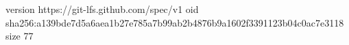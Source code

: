 version https://git-lfs.github.com/spec/v1
oid sha256:a139bde7d5a6aea1b27e785a7b99ab2b4876b9a1602f3391123b04c0ac7e3118
size 77
